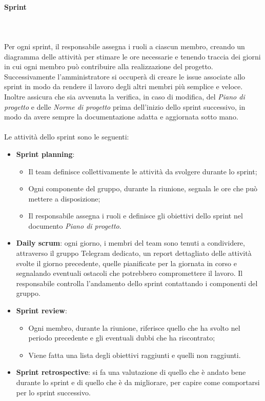 \paragraph*{Sprint}\label{inf:sprint} ~\\\\ Per ogni sprint, il responsabile
assegna i ruoli a ciascun membro, creando un diagramma delle attività per
stimare le ore necessarie e tenendo traccia dei giorni in cui ogni membro può
contribuire alla realizzazione del progetto. Successivamente l'amministratore
si occuperà di creare le issue associate allo sprint in modo da rendere il
lavoro degli altri membri più semplice e veloce. Inoltre assicura che sia
avvenuta la verifica, in caso di modifica, del \textit{Piano di progetto} e
delle \textit{Norme di progetto} prima dell'inizio dello sprint successivo, in
modo da avere sempre la documentazione adatta e aggiornata sotto mano.\\\\ Le
attività dello sprint sono le seguenti:
\begin{itemize}
    \item \textbf{Sprint planning}:
          \begin{itemize}
              \item Il team definisce collettivamente le attività da svolgere durante lo sprint;
              \item Ogni componente del gruppo, durante la riunione, segnala le ore che può mettere
                    a disposizione;
              \item Il responsabile assegna i ruoli e definisce gli obiettivi dello sprint nel
                    documento \textit{Piano di progetto}.
          \end{itemize}
    \item \textbf{Daily scrum}: ogni giorno, i membri del team sono tenuti a condividere, attraverso il gruppo Telegram dedicato,
          un report dettagliato delle attività svolte il giorno precedente,
          quelle pianificate per la giornata in corso e segnalando eventuali ostacoli che potrebbero compromettere il lavoro.
          Il responsabile controlla l'andamento dello sprint contattando i componenti del gruppo.
    \item \textbf{Sprint review}:
          \begin{itemize}
              \item Ogni membro, durante la riunione, riferisce quello che ha svolto nel periodo
                    precedente e gli eventuali dubbi che ha riscontrato;
              \item Viene fatta una lista degli obiettivi raggiunti e quelli non raggiunti.
          \end{itemize}
    \item \textbf{Sprint retrospective}: si fa una valutazione di quello che è andato bene durante lo sprint e di
          quello che è da migliorare, per capire come comportarsi per lo sprint successivo.
\end{itemize}

